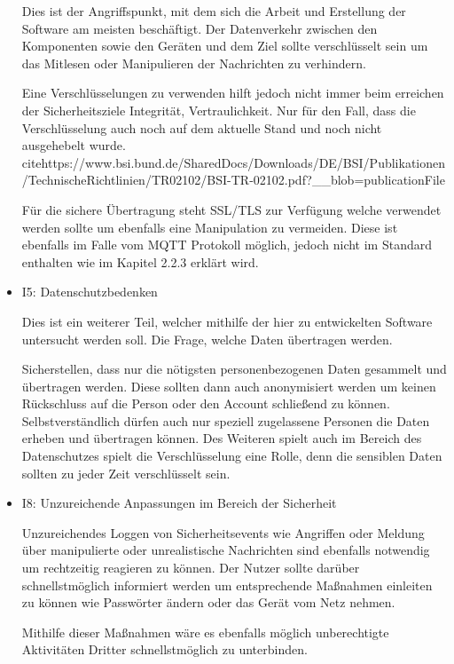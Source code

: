 \begin{itemize}
        Dies ist der Angriffspunkt, mit dem sich die Arbeit und Erstellung der Software am meisten beschäftigt.
        Der Datenverkehr zwischen den Komponenten sowie den Geräten und dem Ziel sollte verschlüsselt sein um das Mitlesen oder Manipulieren der Nachrichten zu verhindern.
        
        Eine Verschlüsselungen zu verwenden hilft jedoch nicht immer beim erreichen der Sicherheitsziele Integrität, Vertraulichkeit. Nur für den Fall, dass die Verschlüsselung auch noch auf dem aktuelle Stand und noch nicht ausgehebelt wurde. cite{https://www.bsi.bund.de/SharedDocs/Downloads/DE/BSI/Publikationen/TechnischeRichtlinien/TR02102/BSI-TR-02102.pdf?__blob=publicationFile}
        
        Für die sichere Übertragung steht SSL/TLS zur Verfügung welche verwendet werden sollte um ebenfalls eine Manipulation zu vermeiden. Diese ist ebenfalls im Falle vom \ac{MQTT} Protokoll möglich, jedoch nicht im Standard enthalten wie im Kapitel 2.2.3 erklärt wird.
        
        \item I5: Datenschutzbedenken
        
        Dies ist ein weiterer Teil, welcher mithilfe der hier zu entwickelten Software untersucht werden soll. Die Frage, welche Daten übertragen werden.
        
        Sicherstellen, dass nur die nötigsten personenbezogenen Daten gesammelt und übertragen werden. Diese sollten dann auch anonymisiert werden um keinen Rückschluss auf die Person oder den Account schließend zu können.
        Selbstverständlich dürfen auch nur speziell zugelassene Personen die Daten erheben und übertragen können.
        Des Weiteren spielt auch im Bereich des Datenschutzes spielt die Verschlüsselung eine Rolle, denn die sensiblen Daten sollten zu jeder Zeit verschlüsselt sein.

        \item I8: Unzureichende Anpassungen im Bereich der Sicherheit
        
        Unzureichendes Loggen von Sicherheitsevents wie Angriffen oder Meldung über manipulierte oder unrealistische Nachrichten sind ebenfalls notwendig um rechtzeitig reagieren zu können. Der Nutzer sollte darüber schnellstmöglich informiert werden um entsprechende Maßnahmen einleiten zu können wie Passwörter ändern oder das Gerät vom Netz nehmen.
        
        Mithilfe dieser Maßnahmen wäre es ebenfalls möglich unberechtigte Aktivitäten Dritter schnellstmöglich zu unterbinden.
        
    \end{itemize}
    
